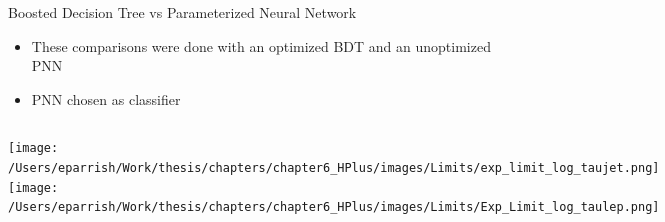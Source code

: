 \documentclass[aspectratio=169,xcolor=table]{beamer}
\begin{document}
    \begin{frame}[t]{Boosted Decision Tree vs Parameterized Neural Network}
      \begin{itemize}
        \item These comparisons were done with an optimized BDT and an unoptimized PNN
        \item PNN chosen as classifier
      \end{itemize}
      \begin{columns}
      \centering
      \texttt{[image: /Users/eparrish/Work/thesis/chapters/chapter6\_HPlus/images/Limits/exp\_limit\_log\_taujet.png]}
      \centering
      \texttt{[image: /Users/eparrish/Work/thesis/chapters/chapter6\_HPlus/images/Limits/Exp\_Limit\_log\_taulep.png]}
      \end{columns}
    \end{frame}
\end{document}
